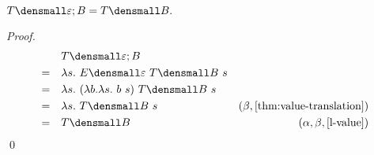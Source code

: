     

\begin{lemma}
  \label{thm:tmpl-compose-id-left}
  $ T\den{\varepsilon; B} = T\den{B}.$
\end{lemma}
    \begin{proof}
        \begin{align*}
            &\quad T\den{\varepsilon; B} \\
            =& \quad \lambda s. ~ E\den{\varepsilon} ~T\den{B} ~s \\
            =& \quad \lambda s. ~ (\lambda b. \lambda s.~ b ~s) ~T\den{B} ~s \\
            =& \quad \lambda s. ~ T\den{B} ~s & (\beta, \cref{thm:value-translation})\\
            =& \quad T\den{B} & (\alpha, \beta, \cref{l-value})
        \end{align*}
        \qed
    \end{proof}

